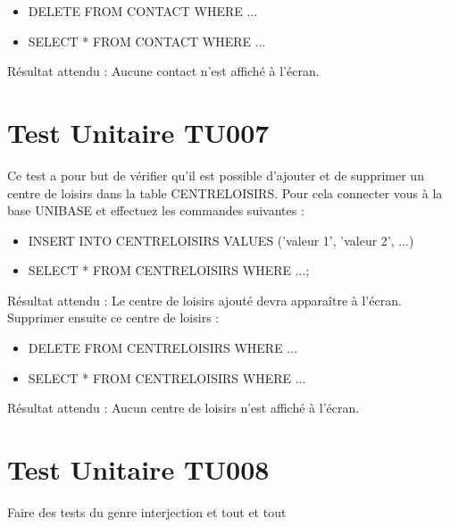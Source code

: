 	\begin{itemize}
		\item DELETE FROM CONTACT WHERE ...
		\item SELECT * FROM CONTACT WHERE ...
	\end{itemize}	 
	
	Résultat attendu : Aucune contact n'est affiché à l'écran.
	
	
\section{Test Unitaire TU007}
	Ce test a pour but de vérifier qu'il est possible d'ajouter et de supprimer un centre de loisirs dans la table CENTRELOISIRS. Pour cela connecter vous à la base UNIBASE et effectuez les commandes suivantes : \\
	
	\begin{itemize}
		\item INSERT INTO CENTRELOISIRS VALUES ('valeur 1', 'valeur 2', ...)
		\item SELECT * FROM CENTRELOISIRS WHERE ...;
	\end{itemize}
	
	Résultat attendu : Le centre de loisirs ajouté devra apparaître à l'écran. \\
	
	Supprimer ensuite ce centre de loisirs : \\
	
	\begin{itemize}
		\item DELETE FROM CENTRELOISIRS WHERE ...
		\item SELECT * FROM CENTRELOISIRS WHERE ...
	\end{itemize}	 
	
	Résultat attendu : Aucun centre de loisirs n'est affiché à l'écran.
	
	
\section{Test Unitaire TU008}
	Faire des tests du genre interjection et tout et tout